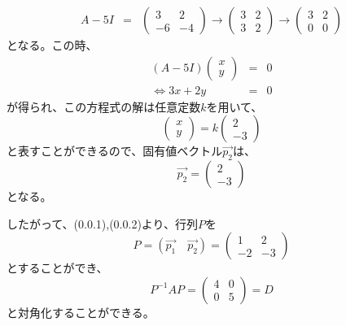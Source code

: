 \documentclass[dvipdfmx,uplatex]{jsarticle}
\begin{document}
\begin{spacing}{1.6}
\begin{qparts}
  \begin{eqnarray*}
    A - 5I & = &
    \left(
    \begin{array}{ccc}
      3 & 2 \\
      -6 & -4
    \end{array}
    \right)
    \rightarrow
    \left(
    \begin{array}{ccc}
      3 & 2 \\
      3 & 2
    \end{array}
    \right)
    \rightarrow
    \left(
    \begin{array}{ccc}
      3 & 2 \\
      0 & 0
    \end{array}
    \right)
  \end{eqnarray*}
  となる。この時、
  \begin{eqnarray*}
    (A - 5I) \left(
    \begin{array}{ccc}
      x \\
      y
    \end{array}
    \right)
    & = & 0 \\
    \Leftrightarrow
    3x + 2y & = & 0
  \end{eqnarray*}
  が得られ、この方程式の解は任意定数$k$を用いて、
  \begin{equation*}
    \left(
    \begin{array}{ccc}
      x \\
      y
    \end{array}
    \right)
    = k
    \left(
    \begin{array}{ccc}
      2 \\
      -3
    \end{array}
    \right)
  \end{equation*}
  と表すことができるので、固有値ベクトル$\overrightarrow{p_2}$は、
  \begin{equation}
    \overrightarrow{p_2} =
    \left(
    \begin{array}{ccc}
      2 \\
      -3
    \end{array}
    \right)
  \end{equation}
  となる。

  \newpage

  したがって、(0.0.1),(0.0.2)より、行列$P$を
  \begin{equation*}
    P = (\overrightarrow{p_1} \quad \overrightarrow{p_2}) =
    \left(
    \begin{array}{ccc}
      1 & 2 \\
      -2 & -3
    \end{array}
    \right)
  \end{equation*}
  とすることができ、
  \begin{equation}
    P^{-1}AP =
    \left(
    \begin{array}{ccc}
      4 & 0 \\
      0 & 5
    \end{array}
    \right)
    = D
  \end{equation}
  と対角化することができる。\\\\


\end{qparts}
\end{spacing}
\end{document}
